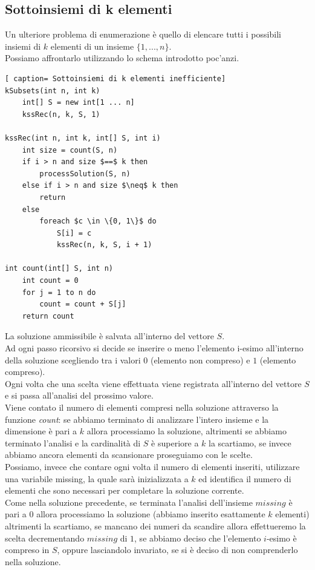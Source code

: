 \documentclass[../cheatSheetAlgoritmi.tex]{subfiles}
\begin{document}
\subsection{Sottoinsiemi di k elementi}
Un ulteriore problema di enumerazione è quello di elencare tutti i possibili insiemi di $k$ elementi di un insieme $\{1, ..., n\}$. \\
Possiamo affrontarlo utilizzando lo schema introdotto poc'anzi.
 \begin{lstlisting}[ caption= Sottoinsiemi di k elementi inefficiente]
kSubsets(int n, int k)
	int[] S = new int[1 ... n]
	kssRec(n, k, S, 1)

kssRec(int n, int k, int[] S, int i)
	int size = count(S, n)
	if i > n and size $==$ k then
		processSolution(S, n)
	else if i > n and size $\neq$ k then
		return 
	else
		foreach $c \in \{0, 1\}$ do
			S[i] = c
			kssRec(n, k, S, i + 1)
			
int count(int[] S, int n)
	int count = 0
	for j = 1 to n do
		count = count + S[j]
	return count
\end{lstlisting}
La soluzione ammissibile è salvata all'interno del vettore $S$. \\
Ad ogni passo ricorsivo si decide se inserire o meno l'elemento i-esimo all'interno della soluzione scegliendo tra i valori $0$ (elemento non compreso) e $1$ (elemento compreso).  \\
Ogni volta che una scelta viene effettuata viene registrata all'interno del vettore $S$ e si passa all'analisi del prossimo valore. \\
Viene contato il numero di elementi compresi nella soluzione attraverso la funzione \emph{count}: se abbiamo terminato di analizzare l'intero insieme e la dimensione è pari a $k$ allora processiamo la soluzione, altrimenti se abbiamo terminato l'analisi e la cardinalità di $S$ è superiore a $k$ la scartiamo, se invece abbiamo ancora elementi da scansionare proseguiamo con le scelte. \\
Possiamo, invece che contare ogni volta il numero di elementi inseriti, utilizzare una variabile missing, la quale sarà inizializzata a $k$ ed identifica il numero di elementi che sono necessari per completare la soluzione corrente. \\ 
Come nella soluzione precedente, se terminata l'analisi dell'insieme $missing$ è pari a $0$ allora processiamo la soluzione (abbiamo inserito esattamente $k$ elementi) altrimenti la scartiamo, se mancano dei numeri da scandire allora effettueremo la scelta decrementando $missing$ di $1$, se abbiamo deciso che l'elemento $i$-esimo è compreso in $S$, oppure lasciandolo invariato, se si è deciso di non comprenderlo nella soluzione. 
\end{document}
